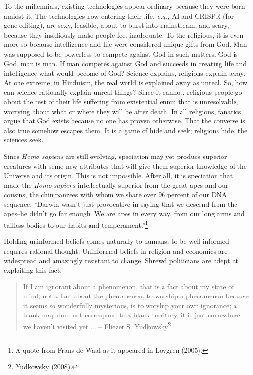 \begin{multicols}{2}
To the millennials, existing technologies appear ordinary because they were born amidst it. The technologies now entering their life, \textit{e.g.,} AI and CRISPR (for gene editing), are sexy, feasible, about to burst into mainstream, and scary, because they insidiously make people feel inadequate. To the religious, it is even more so because intelligence and life were considered unique gifts from God. Man was supposed to be powerless to compete against God in such matters. God is God, man is man. If man competes against God and succeeds in creating life and intelligence what would become of God? Science explains, religions explain away. At one extreme, in Hinduism, the real world is explained away as unreal. So, how can science rationally explain unreal things? Since it cannot, religious people go about the rest of their life suffering from existential ennui that is unresolvable, worrying about what or where they will be after death. In all religions, fanatics argue that God exists because no one has proven otherwise. That the converse is also true somehow escapes them. It is a game of hide and seek; religions hide, the sciences seek.

Since \textit{Homo sapiens} are still evolving, speciation may yet produce superior creatures with some new attributes that will give them superior knowledge of the Universe and its origin. This is not impossible. After all, it is speciation that made the \textit{Homo sapiens} intellectually superior from the great apes and our cousins, the chimpanzees with whom we share over 96 percent of our DNA sequence. “Darwin wasn't just provocative in saying that we descend from the apes--he didn't go far enough. We are apes in every way, from our long arms and tailless bodies to our habits and temperament.”\footnote{A quote from Frans de Waal as it appeared in Lovgren (2005).}

Holding uninformed beliefs comes naturally to humans, to be well-informed requires rational thought. Uninformed beliefs in religion and economics are widespread and amazingly resistant to change. Shrewd politicians are adept at exploiting this fact.
\begin{quote}
If I am ignorant about a phenomenon, that is a fact about my state of mind, not a fact about the phenomenon; to worship a phenomenon because it seems so wonderfully mysterious, is to worship your own ignorance; a blank map does not correspond to a blank territory, it is just somewhere we haven't visited yet ... -- Eliezer S. Yudkowsky\footnote{Yudkowsky (2008).}
\end{quote}


\end{multicols}
